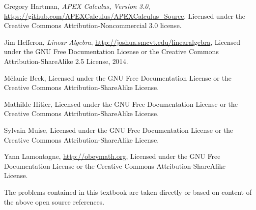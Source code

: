 

\begin{thebibliography}{9}
\label{label:authors}
Gregory Hartman,
\emph{APEX Calculus, Version 3.0},
\url{https://github.com/APEXCalculus/APEXCalculus_Source},
Licensed under the
Creative Commons Attribution-Noncommercial 3.0 license.


 

Jim Hefferon,
\emph{Linear Algebra},
\url{http://joshua.smcvt.edu/linearalgebra},
Licensed under the GNU Free Documentation License or the 
Creative Commons Attribution-ShareAlike 2.5 License,
2014.


M\'elanie Beck,
Licensed under the GNU Free Documentation License or the
Creative Commons Attribution-ShareAlike License.



Mathilde Hitier,
Licensed under the GNU Free Documentation License or the
Creative Commons Attribution-ShareAlike License.



Sylvain Muise,
Licensed under the GNU Free Documentation License or the
Creative Commons Attribution-ShareAlike License.



Yann Lamontagne,
\url{http://obeymath.org},
Licensed under the GNU Free Documentation License or the 
Creative Commons Attribution-ShareAlike License.

\end{thebibliography}
The problems contained in this textbook are taken directly or based on content of the above open source references.


